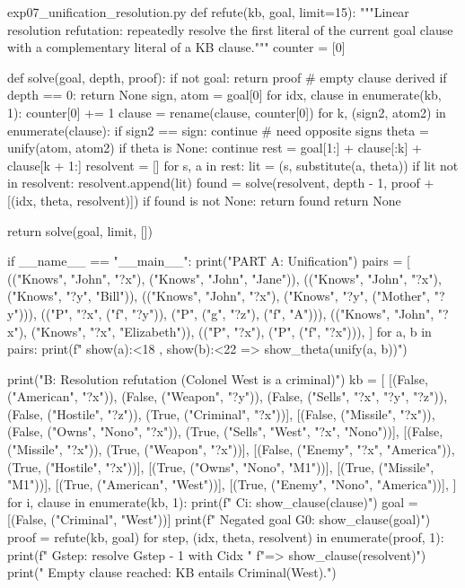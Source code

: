 \documentclass[11pt,a4paper]{article}
\begin{document}
\begin{pycode}{exp07\_unification\_resolution.py}
def refute(kb, goal, limit=15):
    """Linear resolution refutation: repeatedly resolve the first literal
    of the current goal clause with a complementary literal of a KB clause."""
    counter = [0]

    def solve(goal, depth, proof):
        if not goal:
            return proof                          # empty clause derived
        if depth == 0:
            return None
        sign, atom = goal[0]
        for idx, clause in enumerate(kb, 1):
            counter[0] += 1
            clause = rename(clause, counter[0])
            for k, (sign2, atom2) in enumerate(clause):
                if sign2 == sign:
                    continue                      # need opposite signs
                theta = unify(atom, atom2)
                if theta is None:
                    continue
                rest = goal[1:] + clause[:k] + clause[k + 1:]
                resolvent = []
                for s, a in rest:
                    lit = (s, substitute(a, theta))
                    if lit not in resolvent:
                        resolvent.append(lit)
                found = solve(resolvent, depth - 1,
                              proof + [(idx, theta, resolvent)])
                if found is not None:
                    return found
        return None

    return solve(goal, limit, [])


if __name__ == "__main__":
    print("PART A: Unification")
    pairs = [
        (("Knows", "John", "?x"), ("Knows", "John", "Jane")),
        (("Knows", "John", "?x"), ("Knows", "?y", "Bill")),
        (("Knows", "John", "?x"), ("Knows", "?y", ("Mother", "?y"))),
        (("P", "?x", ("f", "?y")), ("P", ("g", "?z"), ("f", "A"))),
        (("Knows", "John", "?x"), ("Knows", "?x", "Elizabeth")),
        (("P", "?x"), ("P", ("f", "?x"))),
    ]
    for a, b in pairs:
        print(f"   {show(a):<18} , {show(b):<22} => {show_theta(unify(a, b))}")

    print("\nPART B: Resolution refutation (Colonel West is a criminal)")
    kb = [
        [(False, ("American", "?x")), (False, ("Weapon", "?y")),
         (False, ("Sells", "?x", "?y", "?z")), (False, ("Hostile", "?z")),
         (True, ("Criminal", "?x"))],
        [(False, ("Missile", "?x")), (False, ("Owns", "Nono", "?x")),
         (True, ("Sells", "West", "?x", "Nono"))],
        [(False, ("Missile", "?x")), (True, ("Weapon", "?x"))],
        [(False, ("Enemy", "?x", "America")), (True, ("Hostile", "?x"))],
        [(True, ("Owns", "Nono", "M1"))],
        [(True, ("Missile", "M1"))],
        [(True, ("American", "West"))],
        [(True, ("Enemy", "Nono", "America"))],
    ]
    for i, clause in enumerate(kb, 1):
        print(f"   C{i}: {show_clause(clause)}")
    goal = [(False, ("Criminal", "West"))]
    print(f"   Negated goal G0: {show_clause(goal)}")
    proof = refute(kb, goal)
    for step, (idx, theta, resolvent) in enumerate(proof, 1):
        print(f"   G{step}: resolve G{step - 1} with C{idx} "
              f"=> {show_clause(resolvent)}")
    print("   Empty clause reached: KB entails Criminal(West).")
\end{pycode}
\end{document}
